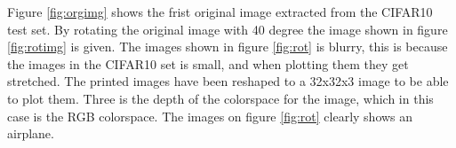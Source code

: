 
Figure \ref{fig:orgimg} shows the frist original image extracted from the CIFAR10 test set. By rotating the original image with 40 degree the image shown in figure \ref{fig:rotimg} is given. The images shown in figure \ref{fig:rot} is blurry, this is because the images in the CIFAR10 set is small, and when plotting them they get stretched. The printed images have been reshaped to a 32x32x3 image to be able to plot them. Three is the depth of the colorspace for the image, which in this case is the RGB colorspace. The images on figure \ref{fig:rot} clearly shows an airplane. 

